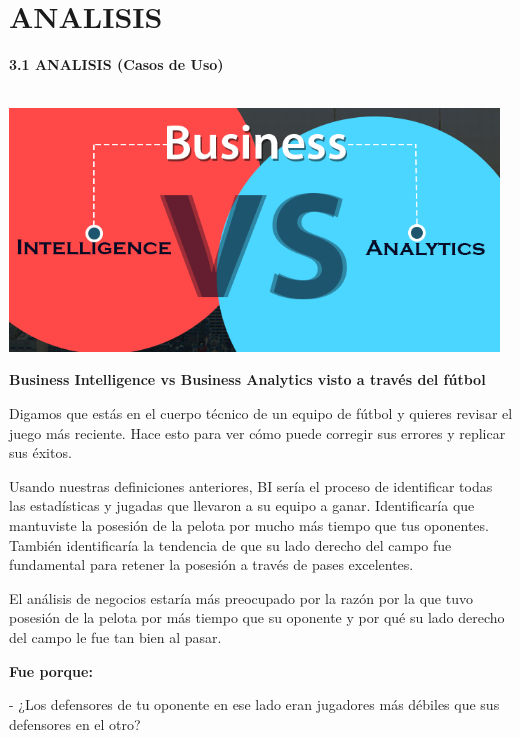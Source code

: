 \section{ANALISIS} 
\begin{flushleft}
\textbf {3.1 ANALISIS (Casos de Uso)}\\

\textbf{}\\
\begin{center}
\includegraphics[width=13cm]{./Imagenes/image01}
\end{center}
\begin{center}
\textbf{Business Intelligence vs Business Analytics visto a través del fútbol}\\
\end{center}
\item 
Digamos que estás en el cuerpo técnico de un equipo de fútbol y quieres revisar el juego más reciente. Hace esto para ver cómo puede corregir sus errores y replicar sus éxitos.
\item 
Usando nuestras definiciones anteriores,  BI  sería el proceso de identificar todas las estadísticas y jugadas que llevaron a su equipo a ganar. Identificaría que mantuviste la posesión de la pelota por mucho más tiempo que tus oponentes. También identificaría la tendencia de que su lado derecho del campo fue fundamental para retener la posesión a través de pases excelentes.
\item 
El análisis de negocios  estaría más preocupado por la  razón por la  que tuvo posesión de la pelota por más tiempo que su oponente y por qué su lado derecho del campo le fue tan bien al pasar.
\item 
\item 
\textbf{Fue porque:}\\
\item 
- ¿Los defensores de tu oponente en ese lado eran jugadores más débiles que sus defensores en el otro?

\end{flushleft}
